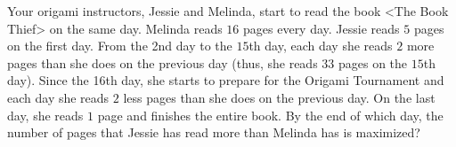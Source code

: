 Your origami instructors, Jessie and Melinda, start to read the book <The Book Thief> on the same day. Melinda reads $16$ pages every day. Jessie reads $5$ pages on the first day. From the 2nd day to the $15$th day, each day she reads $2$ more pages than she does on the previous day (thus, she reads $33$ pages on the $15$th day). Since the 16th day, she starts to prepare for the Origami Tournament and each day she reads $2$ less pages than she does on the previous day. On the last day, she reads $1$ page and finishes the entire book. By the end of which day, the number of pages that Jessie has read more than Melinda has is maximized?

